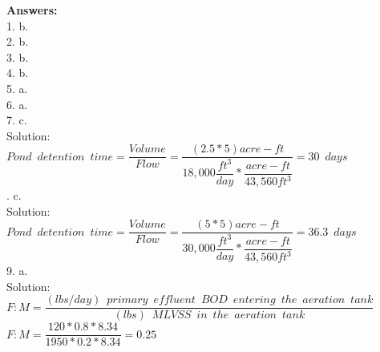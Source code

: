 \vspace{1cm}
\textbf{Answers:}\\
1.	b.  \\

\vspace{0.3cm}
2.	b. \\ 


\vspace{0.3cm}
3.	b. \\ 


\vspace{0.3cm}
4.	b.  \\


\vspace{0.3cm}
5.	a. \\ 


\vspace{0.3cm}
6.	a.\\  


\vspace{0.3cm}
7.	c. \\ 
\vspace{0.3cm}
Solution:\\
\vspace{0.3cm}
$Pond \enspace detention \enspace time=\dfrac{Volume}{Flow}=\dfrac{(2.5*5)acre-ft}{18,000\dfrac{ft^3}{day}*\dfrac{acre-ft}{43,560ft^3}}=\boxed{30 \enspace days}$\\ 

.	c.  \\
\vspace{0.3cm}
Solution:\\
$Pond \enspace detention \enspace time=\dfrac{Volume}{Flow}=\dfrac{(5*5)acre-ft}{30,000\dfrac{ft^3}{day}*\dfrac{acre-ft}{43,560ft^3}}=\boxed{36.3 \enspace days}$\\

\vspace{0.3cm}
9.	a.  \\

Solution:\\
\vspace{0.3cm}
$F:M=\dfrac{(lbs/day) \enspace primary \enspace effluent  \enspace BOD \enspace entering \enspace the  \enspace aeration \enspace tank}{(lbs) \enspace MLVSS \enspace in \enspace the  \enspace aeration \enspace tank}$\\
\vspace{0.3cm}
$F:M=\dfrac{120*0.8*8.34}{1950*0.2*8.34}=\boxed{0.25}$\\

